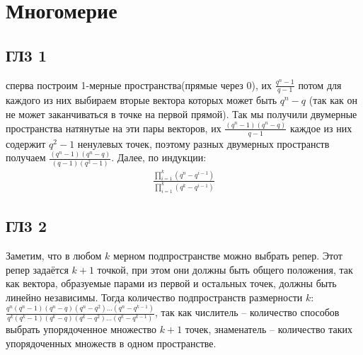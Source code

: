 \newpage		
	\section{Многомерие}
		
		\subsection{ГЛ3 1}		
		сперва построим 1-мерные пространства(прямые через 0), их $\frac{q^n-1}{q-1}$ потом для каждого из них выбираем вторые вектора которых может быть $q^n-q$ (так как он не может заканчиваться в точке на первой прямой). Так мы получили двумерные пространства натянутые на эти пары векторов, их $\frac{(q^n-1)(q^n-q)}{q-1}$ каждое из них содержит $q^2-1$ ненулевых точек, поэтому разных двумерных пространств получаем $\frac{(q^n-1)(q^n-q)}{(q-1)(q^2-1)}$. Далее, по индукции:
		\begin{gather*}
		\frac{
		\prod\limits_{i = 1}^k (q^n - q^{i-1})
		}{
		\prod\limits_{i = 1}^k (q^k - q^{i-1})
		}
		\end{gather*}
		
		\subsection{ГЛ3 2}		
		Заметим, что в любом $k$ мерном подпространстве можно выбрать репер. Этот репер задаётся $k+1$ точкой, при этом они должны быть общего положения, так как вектора, образуемые парами из первой и остальных точек, должны быть линейно независимы. Тогда количество подпространств размерности $k$: $\frac{q^n(q^n-1)(q^n-q)(q^n-q^2)\ldots(q^n-q^{k-1}) }{q^k(q^k-1)(q^k-q)(q^k-q^2)\ldots(q^k-q^{k-1}) }$, так как числитель -- количество способов выбрать упорядоченное множество $k+1$ точек, знаменатель -- количество таких упорядоченных множеств в одном пространстве.
		
